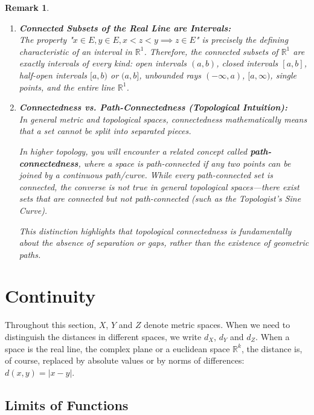 \documentclass{article}
\theoremstyle{mythm}
\newtheorem{remark}[theorem]{Remark}
\begin{document}
\begin{remark}

\begin{enumerate}
    \item \textbf{Connected Subsets of the Real Line are Intervals:} \\
    The property "$x \in E, y \in E, x < z < y \implies z \in E$" is precisely the defining characteristic of an interval in $\mathbb{R}^1$. Therefore, the connected subsets of $\mathbb{R}^1$ are exactly intervals of every kind: open intervals $(a, b)$, closed intervals $[a, b]$, half-open intervals $[a, b)$ or $(a, b]$, unbounded rays $(-\infty, a)$, $[a, \infty)$, single points, and the entire line $\mathbb{R}^1$.

    \item \textbf{Connectedness vs. Path-Connectedness (Topological Intuition):} \\
    In general metric and topological spaces, connectedness mathematically means that a set \textit{cannot be split into separated pieces}. 
    
    In higher topology, you will encounter a related concept called \textbf{path-connectedness}, where a space is path-connected if any two points can be joined by a continuous path/curve. While every path-connected set is connected, the converse is not true in general topological spaces—there exist sets that are connected but not path-connected (such as the Topologist's Sine Curve). 
    
    This distinction highlights that topological connectedness is fundamentally about the \textit{absence of separation or gaps}, rather than the existence of geometric paths.
\end{enumerate}
\end{remark}

\clearpage
\section{Continuity}

Throughout this section, $X$, $Y$ and $Z$ denote metric spaces. When we need to distinguish the distances in different spaces, we write $d_X$, $d_Y$ and $d_Z$. When a space is the real line, the complex plane or a euclidean space $\mathbb{R}^k$, the distance is, of course, replaced by absolute values or by norms of differences: $d(x,y) = |x-y|$.

\subsection{Limits of Functions}
\end{document}
